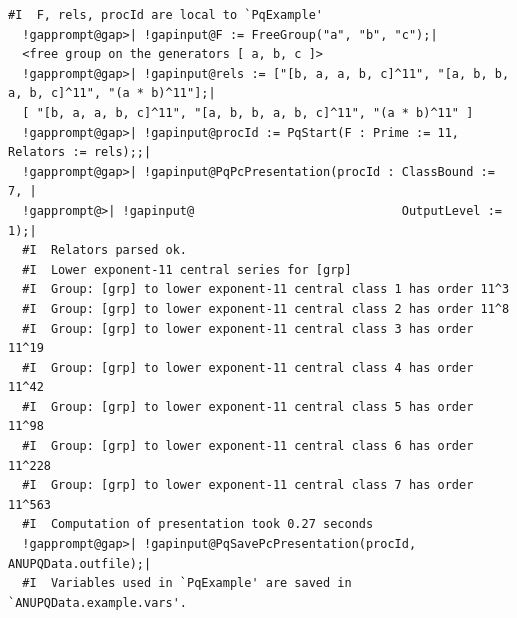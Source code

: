 \documentclass[a4paper,11pt]{report}
\begin{document}
{{\begin{Verbatim}[commandchars=!@|,fontsize=\small,frame=single,label=Example]
  #I  F, rels, procId are local to `PqExample'
  !gapprompt@gap>| !gapinput@F := FreeGroup("a", "b", "c");|
  <free group on the generators [ a, b, c ]>
  !gapprompt@gap>| !gapinput@rels := ["[b, a, a, b, c]^11", "[a, b, b, a, b, c]^11", "(a * b)^11"];|
  [ "[b, a, a, b, c]^11", "[a, b, b, a, b, c]^11", "(a * b)^11" ]
  !gapprompt@gap>| !gapinput@procId := PqStart(F : Prime := 11, Relators := rels);;|
  !gapprompt@gap>| !gapinput@PqPcPresentation(procId : ClassBound := 7, |
  !gapprompt@>| !gapinput@                             OutputLevel := 1);|
  #I  Relators parsed ok.
  #I  Lower exponent-11 central series for [grp]
  #I  Group: [grp] to lower exponent-11 central class 1 has order 11^3
  #I  Group: [grp] to lower exponent-11 central class 2 has order 11^8
  #I  Group: [grp] to lower exponent-11 central class 3 has order 11^19
  #I  Group: [grp] to lower exponent-11 central class 4 has order 11^42
  #I  Group: [grp] to lower exponent-11 central class 5 has order 11^98
  #I  Group: [grp] to lower exponent-11 central class 6 has order 11^228
  #I  Group: [grp] to lower exponent-11 central class 7 has order 11^563
  #I  Computation of presentation took 0.27 seconds
  !gapprompt@gap>| !gapinput@PqSavePcPresentation(procId, ANUPQData.outfile);|
  #I  Variables used in `PqExample' are saved in `ANUPQData.example.vars'.
\end{Verbatim}
 }

 
}
\end{document}
